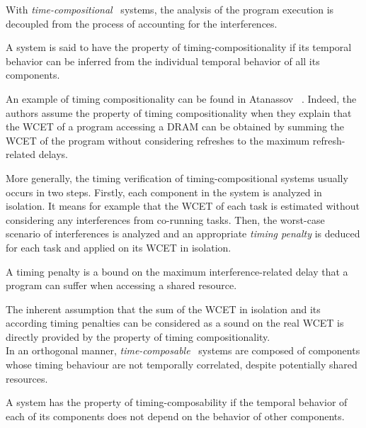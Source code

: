 \documentclass[main.tex]{subfiles}
\begin{document}
With \emph{time-compositional}~\cite{Hahn2015} systems, the analysis of the program execution is decoupled from the process of accounting for the interferences. 
\begin{definition}
    \label{def_stateOfTheArt_timeCompositional}
    A system is said to have the property of timing-compositionality if its temporal behavior can be inferred from the individual temporal behavior of all its components. 
\end{definition}

An example of timing compositionality can be found in Atanassov \etal~\cite{Atanassov2001}. Indeed, the authors assume the property of timing compositionality when they explain that the WCET of a program accessing a DRAM can be obtained by summing the WCET of the program without considering refreshes to the maximum refresh-related delays.

More generally, the timing verification of timing-compositional systems usually occurs in two steps. Firstly, each component in the system is analyzed in isolation. It means for example that the WCET of each task is estimated without considering any interferences from co-running tasks. Then, the worst-case scenario of interferences is analyzed and an appropriate \emph{timing penalty} is deduced for each task and applied on its WCET in isolation. 

\begin{definition}
A timing penalty is a bound on the maximum interference-related delay that a program can suffer when accessing a shared resource.
\end{definition}

The inherent assumption that the sum of the WCET in isolation and its according timing penalties can be considered as a sound on the real WCET is directly provided by the property of timing compositionality.\\

In an orthogonal manner, \emph{time-composable}~\cite{Hahn2015} systems are composed of components whose timing behaviour are not temporally correlated, despite potentially shared resources.

\begin{definition}
    \label{def_stateOfTheArt_timeComposable}
    A system has the property of timing-composability if the temporal behavior of each of its components does not depend on the behavior of other components.
\end{definition}
\end{document}
